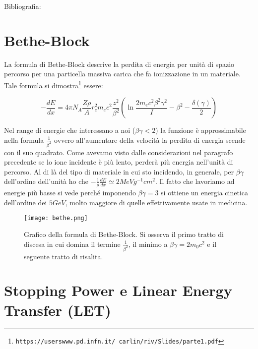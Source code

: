 \documentclass [a4paper, twoside] {book}
\begin{document}
Bibliografia: \cite{Longo}

\section{Bethe-Block}

La formula di Bethe-Block descrive la perdita di energia per unità di spazio percorso per una particella massiva carica che fa ionizzazione in un materiale. Tale formula si dimostra\footnote{\texttt{https://userswww.pd.infn.it/~carlin/riv/Slides/parte1.pdf}} essere:

\begin{equation}
-\frac{dE}{dx}=4\pi N_A\frac{Z\rho}{A}r_e^2m_ec^2\frac{z^2}{\beta^2}(\ln\frac{2m_ec^2\beta^2\gamma^2}{I}-\beta^2-\frac{\delta(\gamma)}{2})
\end{equation}

Nel range di energie che interessano a noi ($\beta\gamma<2$) la funzione è approssimabile nella formula $\frac{1}{\beta^2}$ ovvero all'aumentare della velocità la perdita di energia scende con il suo quadrato. Come avevamo visto dalle considerazioni nel paragrafo precedente se lo ione incidente è più lento, perderà più energia nell'unità di percorso. Al di là del tipo di materiale in cui sto incidendo, in generale, per $\beta\gamma$ dell'ordine dell'unità ho che $-\frac{1}{\rho}\frac{dE}{dx}\simeq2MeV g^{-1}cm^{2}$.
Il fatto che lavoriamo ad energie più basse si vede perché imponendo $\beta\gamma=3$ si ottiene un energia cinetica dell'ordine dei $5 GeV$, molto maggiore di quelle effettivamente usate in medicina.

\begin{figure}[]
\centering
	\texttt{[image: bethe.png]}
	\caption{Grafico della formula di Bethe-Block. Si osserva il primo tratto di discesa in cui domina il termine $\frac{1}{\beta^2}$, il minimo a $\beta\gamma=2m_0c^2$ e il seguente tratto di risalita.}
	\label{fig:bethe}
\end{figure}



\newpage

\section{Stopping Power e Linear Energy Transfer (LET)}
\end{document}
